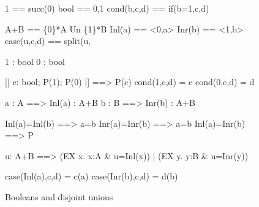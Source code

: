 \begin{figure}
\begin{ttbox}
        1    == succ(0)
       bool == {0,1}
       cond(b,c,d) == if(b=1,c,d)

        A+B == \{0\}*A Un \{1\}*B
        Inl(a) == <0,a>
        Inr(b) == <1,b>
       case(u,c,d) == split(u, %

        1 : bool
        0 : bool

          [| c: bool;  P(1);  P(0) |] ==> P(c)
         cond(1,c,d) = c
         cond(0,c,d) = d

       a : A ==> Inl(a) : A+B
       b : B ==> Inr(b) : A+B

     Inl(a)=Inl(b) ==> a=b
     Inr(a)=Inr(b) ==> a=b
    Inl(a)=Inr(b) ==> P

   u: A+B ==> (EX x. x:A & u=Inl(x)) | (EX y. y:B & u=Inr(y))

       case(Inl(a),c,d) = c(a)
       case(Inr(b),c,d) = d(b)
\end{ttbox}
\caption{Booleans and disjoint unions} \label{zf-sum}
\end{figure}

